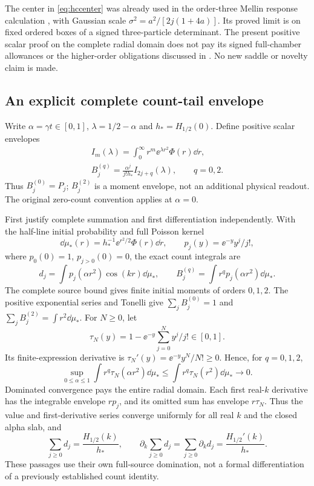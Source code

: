 The center in \eqref{eq:hccenter} was already used in the order-three
Mellin response calculation \cite[Section 2, (3)]{MC03ScalarSaddle}, with
Gaussian scale $\sigma^2=a^2/[2j(1+4a)]$. Its proved limit is on fixed
ordered boxes of a signed three-particle determinant. The present positive
scalar proof on the complete radial domain does not pay its signed
full-chamber allowances or the higher-order obligations discussed in
\cite{MC03HigherOrder}. No new saddle or novelty claim is made.

\subsection{An explicit complete count-tail envelope}
Write $\alpha=\gamma t\in[0,1]$, $\lambda=1/2-\alpha$ and
$h_*=H_{1/2}(0)$. Define positive scalar envelopes
\begin{equation}\label{eq:tailB}
 \begin{gathered}
 I_m(\lambda)=\int_0^\infty r^m\ee^{\lambda r^2}\Phi(r)\dd r,\\
 B_j^{(q)}=\frac{\alpha^j}{j!h_*}I_{2j+q}(\lambda),\qquad q=0,2.
 \end{gathered}
\end{equation}
Thus $B_j^{(0)}=P_j$; $B_j^{(2)}$ is a moment envelope, not an additional
physical readout. The original zero-count convention applies at $\alpha=0$.

First justify complete summation and first differentiation independently.
With the half-line initial probability and full Poisson kernel
\[
 \dd\mu_*(r)=h_*^{-1}\ee^{r^2/2}\Phi(r)\dd r,\qquad
 p_j(y)=\ee^{-y}y^j/j!,
\]
where $p_0(0)=1$, $p_{j>0}(0)=0$, the exact count integrals are
\begin{equation}\label{eq:tailPoisson}
 d_j=\int p_j(\alpha r^2)\cos(kr)\dd\mu_*,\qquad
 B_j^{(q)}=\int r^qp_j(\alpha r^2)\dd\mu_*.
\end{equation}
The complete source bound gives finite initial moments of orders $0,1,2$.
The positive exponential series and Tonelli give
$\sum_jB_j^{(0)}=1$ and $\sum_jB_j^{(2)}=\int r^2\dd\mu_*$.
For $N\ge0$, let
\[
 \tau_N(y)=1-\ee^{-y}\sum_{j=0}^Ny^j/j!\in[0,1].
\]
Its finite-expression derivative is
$\tau_N'(y)=\ee^{-y}y^N/N!\ge0$. Hence, for $q=0,1,2$,
\begin{equation}\label{eq:tailuniformdomination}
 \sup_{0\le\alpha\le1}\int r^q\tau_N(\alpha r^2)\dd\mu_*
 \le\int r^q\tau_N(r^2)\dd\mu_*\longrightarrow0.
\end{equation}
Dominated convergence pays the entire radial domain. Each first real-$k$
derivative has the integrable envelope $rp_j$, and its omitted sum has
envelope $r\tau_N$. Thus the value and first-derivative series converge
uniformly for all real $k$ and the closed alpha slab, and
\begin{equation}\label{eq:tailcomplete}
 \sum_{j\ge0}d_j=\frac{H_{1/2}(k)}{h_*},\qquad
 \partial_k\sum_{j\ge0}d_j=\sum_{j\ge0}\partial_kd_j
 =\frac{H_{1/2}'(k)}{h_*}.
\end{equation}
These passages use their own full-source domination, not a formal
differentiation of a previously established count identity.

